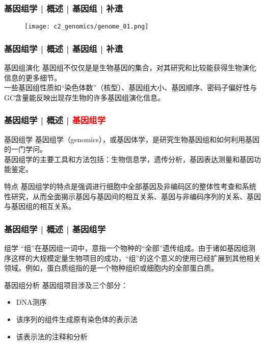 \begin{frame}
  \frametitle{基因组学 | 概述 | 基因组 | 补遗}
  \begin{figure}
    \centering
    \texttt{[image: c2\_genomics/genome\_01.png]}
  \end{figure}
\end{frame}

\begin{frame}
  \frametitle{基因组学 | 概述 | 基因组 | 补遗}
  \begin{block}{基因组演化}
基因组不仅仅是是生物基因的集合，对其研究和比较能获得生物演化信息的更多细节。\\
\vspace{1em}
一些基因组性质如“染色体数”（核型）、基因组大小、基因顺序、密码子偏好性与GC含量能反映出现存生物的许多基因组演化信息。
  \end{block}
\end{frame}

\begin{frame}
  \frametitle{基因组学 | 概述 | \textcolor{red}{基因组学}}
  \begin{block}{基因组学}
基因组学（genomics），或基因体学，是研究生物基因组和如何利用基因的一门学问。\\
\vspace{0.5em}
基因组学的主要工具和方法包括：生物信息学，遗传分析，基因表达测量和基因功能鉴定。
  \end{block}
  \pause
  \begin{block}{特点}
基因组学的特点是强调进行细胞中全部基因及非编码区的整体性考查和系统性研究，从而全面揭示基因与基因间的相互关系、基因与非编码序列的关系、基因与基因组的相互关系。
  \end{block}
\end{frame}

\begin{frame}
  \frametitle{基因组学 | 概述 | 基因组学}
  \begin{block}{组学}
“组”在基因组一词中，意指一个物种的“全部”遗传组成。由于诸如基因组测序这样的大规模定量生物项目的成功，“组”的这个意义的使用已经扩展到其他相关领域。例如，蛋白质组指的是一个物种组织或细胞内的全部蛋白质。 
  \end{block}
  \pause
  \begin{block}{基因组分析}
基因组项目涉及三个部分：
\begin{itemize}
  \item DNA测序
  \item 该序列的组件生成原有染色体的表示法
  \item 该表示法的注释和分析
\end{itemize}
  \end{block}
\end{frame}

